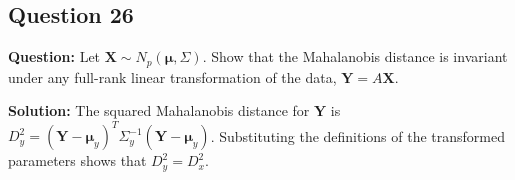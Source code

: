 \subsection*{Question 26}
\textbf{Question:} Let $\mathbf{X} \sim N_p(\boldsymbol{\mu}, \Sigma)$. Show that the Mahalanobis distance is invariant under any full-rank linear transformation of the data, $\mathbf{Y} = A\mathbf{X}$.

\textbf{Solution:}
The squared Mahalanobis distance for $\mathbf{Y}$ is $D_y^2 = (\mathbf{Y}-\boldsymbol{\mu}_y)^T\Sigma_y^{-1}(\mathbf{Y}-\boldsymbol{\mu}_y)$. Substituting the definitions of the transformed parameters shows that $D_y^2 = D_x^2$.
